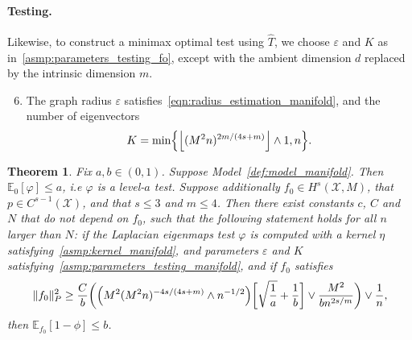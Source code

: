 \documentclass{article}
\newcommand{\floor}[1]{\left\lfloor #1 \right\rfloor}
\newcommand{\1}{\mathbf{1}}
\newcommand{\mc}[1]{\mathcal{#1}}
\newcommand{\Ebb}{\mathbb{E}}
\newcommand{\wh}[1]{\widehat{#1}}
\theoremstyle{alden}
\theoremstyle{aldenthm}
\newtheorem{theorem}{Theorem}
\theoremstyle{definition}
\theoremstyle{remark}
\begin{document}
\paragraph{Testing.}
Likewise, to construct a minimax optimal test using $\wh{T}$, we choose $\varepsilon$ and $K$ as in~\ref{asmp:parameters_testing_fo}, except with the ambient dimension $d$ replaced by the intrinsic dimension $m$.
\begin{enumerate}[label=(P\arabic*)]
	\setcounter{enumi}{5}
	\item 
	\label{asmp:parameters_testing_manifold}
	The graph radius $\varepsilon$ satisfies~\eqref{eqn:radius_estimation_manifold}, and the number of eigenvectors
	\begin{equation*}
	K = \min\Bigl\{\floor{(M^2n)^{2m/(4s + m)}} \wedge 1,n \Bigr\}.
	\end{equation*}
\end{enumerate}

\begin{theorem}
	\label{thm:laplacian_eigenmaps_testing_manifold}
	Fix $a,b \in (0,1)$. Suppose Model~\ref{def:model_manifold}. Then $\mathbb{E}_0[\varphi] \leq a$, i.e $\varphi$ is a level-$a$ test. Suppose additionally $f_0 \in H^s(\mc{X},M)$, that $p \in C^{s-1}(\mc{X})$, and that $s \leq 3$ and $m \leq 4$. Then there exist constants $c$, $C$ and $N$ that do not depend on $f_0$, such that the following statement holds for all $n$ larger than $N$: if the Laplacian eigenmaps test $\varphi$ is computed with a kernel $\eta$ satisfying~\ref{asmp:kernel_manifold}, and parameters $\varepsilon$ and $K$ satisfying~\ref{asmp:parameters_testing_manifold}, and if $f_0$ satisfies
	\begin{equation}
	\label{eqn:laplacian_eigenmaps_testing_criticalradius_manifold}
	\|f_0\|_P^2 \geq \frac{C}{b}\biggl(\Bigl(M^2(M^2n)^{-4s/(4s + m) } \wedge n^{-1/2}\Bigr)\biggl[\sqrt{\frac{1}{a}} + \frac{1}{b}\biggr] \vee \frac{M^2}{b n^{2s/m}} \biggr) \vee \frac{1}{n},
	\end{equation}
	then $\Ebb_{f_0}[1 - \phi] \leq b$.
\end{theorem}
\end{document}
